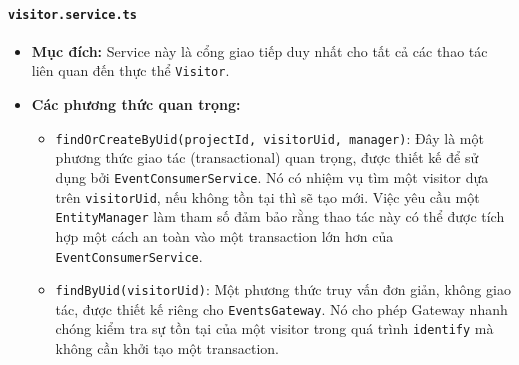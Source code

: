 \paragraph{\texttt{visitor.service.ts}}
\begin{itemize}
    \item \textbf{Mục đích:} Service này là cổng giao tiếp duy nhất cho tất cả các thao tác liên quan đến thực thể \texttt{Visitor}.
    \item \textbf{Các phương thức quan trọng:}    
    \begin{itemize}
        \item \texttt{findOrCreateByUid(projectId, visitorUid, manager)}: Đây là một phương thức giao tác (transactional) quan trọng, được thiết kế để sử dụng bởi \texttt{EventConsumerService}. Nó có nhiệm vụ tìm một visitor dựa trên \texttt{visitorUid}, nếu không tồn tại thì sẽ tạo mới. Việc yêu cầu một \texttt{EntityManager} làm tham số đảm bảo rằng thao tác này có thể được tích hợp một cách an toàn vào một transaction lớn hơn của \texttt{EventConsumerService}.
        \item \texttt{findByUid(visitorUid)}: Một phương thức truy vấn đơn giản, không giao tác, được thiết kế riêng cho \texttt{EventsGateway}. Nó cho phép Gateway nhanh chóng kiểm tra sự tồn tại của một visitor trong quá trình \texttt{identify} mà không cần khởi tạo một transaction.
    \end{itemize}
\end{itemize}

